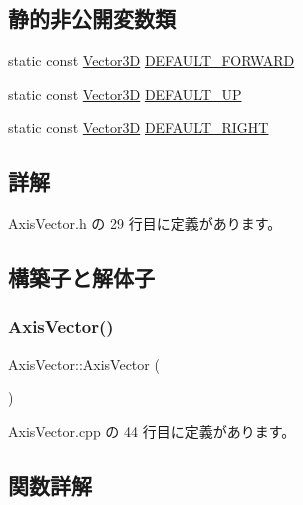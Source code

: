 \subsection*{静的非公開変数類}
\begin{DoxyCompactItemize}
\item 
static const \mbox{\hyperlink{class_vector3_d}{Vector3D}} \mbox{\hyperlink{class_axis_vector_a9c1883607bb0b10748eed84d40f11c93}{D\+E\+F\+A\+U\+L\+T\+\_\+\+F\+O\+R\+W\+A\+RD}}
\item 
static const \mbox{\hyperlink{class_vector3_d}{Vector3D}} \mbox{\hyperlink{class_axis_vector_ae24f32af06534dacd474ba969b48ad4c}{D\+E\+F\+A\+U\+L\+T\+\_\+\+UP}}
\item 
static const \mbox{\hyperlink{class_vector3_d}{Vector3D}} \mbox{\hyperlink{class_axis_vector_a2527f9327895a4c50e668d90aa7b45fc}{D\+E\+F\+A\+U\+L\+T\+\_\+\+R\+I\+G\+HT}}
\end{DoxyCompactItemize}


\subsection{詳解}


 Axis\+Vector.\+h の 29 行目に定義があります。



\subsection{構築子と解体子}
\mbox{\label{class_axis_vector_ae77a05cd990defedbd04914dba1f2326}} 
\subsubsection{\texorpdfstring{Axis\+Vector()}{AxisVector()}}
{\footnotesize\ttfamily Axis\+Vector\+::\+Axis\+Vector (\begin{DoxyParamCaption}{ }\end{DoxyParamCaption})}



 Axis\+Vector.\+cpp の 44 行目に定義があります。



\subsection{関数詳解}
\mbox{\label{class_axis_vector_a1b7758fdc7a7ef1809a7a5de1777ee65}} 

